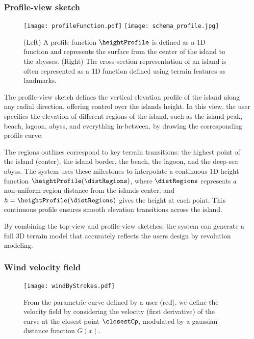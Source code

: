 \subsubsection{Profile-view sketch}

\begin{figure}[H]
	\centering
	\texttt{[image: profileFunction.pdf]}
	\texttt{[image: schema\_profile.jpg]}
    \caption{(Left) A profile function $\heightProfile$ is defined as a 1D function and represents the surface from the center of the island to the abysses. (Right) The cross-section representation of an island is often represented as a 1D function defined using terrain features as landmarks. }
    \label{fig:coral-island_profile-function}
\end{figure}

The profile-view sketch defines the vertical elevation profile of the island along any radial direction, offering control over the islands height. In this view, the user specifies the elevation of different regions of the island, such as the island peak, beach, lagoon, abyss, and everything in-between, by drawing the corresponding profile curve.

The regions outlines correspond to key terrain transitions: the highest point of the island (center), the island border, the beach, the lagoon, and the deep-sea abyss. The system uses these milestones to interpolate a continuous 1D height function $\heightProfile(\distRegions)$, where $\distRegions$ represents a non-uniform region distance from the islands center, and $h = \heightProfile(\distRegions)$ gives the height at each point. This continuous profile ensures smooth elevation transitions across the island.

By combining the top-view and profile-view sketches, the system can generate a full 3D terrain model that accurately reflects the users design by revolution modeling.

\subsubsection{Wind velocity field}

\begin{figure}[ht]
    \centering
    \texttt{[image: windByStrokes.pdf]}
    \caption{From the parametric curve defined by a user (red), we define the velocity field by considering the velocity (first derivative) of the curve at the closest point $\closestCp$, modulated by a gaussian distance function $G(x)$. }
    \label{fig:coral-island_wind-from-strokes}
\end{figure}

